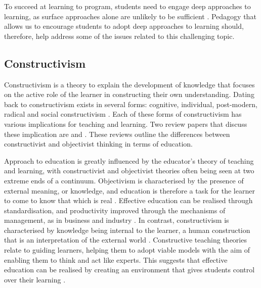 To succeed at learning to program, students need to engage deep approaches to learning, as surface approaches alone are unlikely to be sufficient \cite{Bruce:2003}. Pedagogy that allows us to encourage students to adopt deep approaches to learning should, therefore, help address some of the issues related to this challenging topic.



\subsection{Constructivism} %
\label{sub:constructivism}

Constructivism is a theory to explain the development of knowledge that focuses on the active role of the learner in constructing their own understanding. Dating back to \citet{Piaget:1950} constructivism exists in several forms: cognitive, individual, post-modern, radical and social constructivism \cite{Phillips:1995,Steffe:1995}. Each of these forms of constructivism has various implications for teaching and learning. Two review papers that discuss these implication are \citet{Jonassen:1991} and \citet{Vrasidas:2000}. These reviews outline the differences between constructivist and objectivist thinking in terms of education.

Approach to education is greatly influenced by the educator's theory of teaching and learning, with constructivist and objectivist theories often being seen at two extreme ends of a continuum. Objectivism is characterised by the presence of external meaning, or knowledge, and education is therefore a task for the learner to come to know that which is real \cite{Jonassen:1991,Vrasidas:2000}. Effective education can be realised through standardisation, and productivity improved through the mechanisms of management, as in business and industry \cite{Tyler:1969,Vrasidas:2000}. In contrast, constructivism is characterised by knowledge being internal to the learner, a human construction that is an interpretation of the external world \cite{Jonassen:1991,Vrasidas:2000}. Constructive teaching theories relate to guiding learners, helping them to adopt viable models with the aim of enabling them to think and act like experts. This suggests that effective education can be realised by creating an environment that gives students control over their learning \cite{Vrasidas:2000}. 

